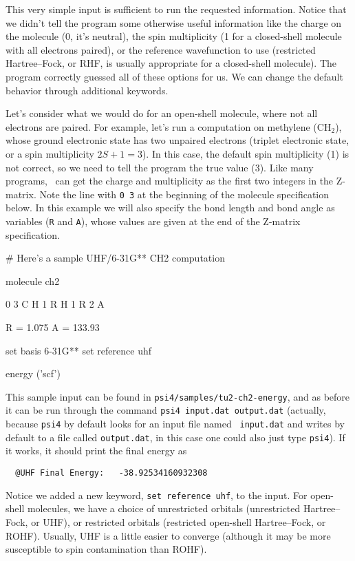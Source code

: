 This very simple input is sufficient to run the requested information.
Notice that we didn't tell the program some otherwise useful information
like the charge on the molecule (0, it's neutral), the spin multiplicity
(1 for a closed-shell molecule with all electrons paired), or the reference
wavefunction to use (restricted Hartree--Fock, or RHF, is usually
appropriate for a closed-shell molecule).  The program correctly guessed
all of these options for us.  We can change the default behavior through
additional keywords.  

Let's consider what we would do for an open-shell molecule, where
not all electrons are paired.  For example, let's run a computation
on methylene (CH$_2$), whose ground electronic state has two unpaired
electrons (triplet electronic state, or a spin multiplicity $2S+1 = 3$).
In this case, the default spin multiplicity (1) is not correct, so we
need to tell the program the true value (3).  Like many programs, \PSIfour\
can get the charge and multiplicity as the first two integers in the
Z-matrix.  Note the line with {\tt 0 3} at the beginning of the molecule
specification below.  In this example we will also specify the bond length
and bond angle as variables ({\tt R} and {\tt A}), whose values are given
at the end of the Z-matrix specification.

\begin{Snippet}
# Here's a sample UHF/6-31G** CH2 computation

molecule ch2 {
  0 3
  C
  H 1 R
  H 1 R 2 A

  R = 1.075
  A = 133.93
}

set basis 6-31G**
set reference uhf

energy ('scf')
\end{Snippet}

This sample input can be found in {\tt psi4/samples/tu2-ch2-energy}, and as
before it can be run through the command {\tt psi4 input.dat output.dat}
(actually, because {\tt psi4} by default looks for an input file named {\tt
input.dat} and writes by default to a file called {\tt output.dat}, in this
case one could also just type {\tt psi4}).  If it works, it should print
the final energy as
\begin{verbatim}
  @UHF Final Energy:   -38.92534160932308
\end{verbatim}
Notice we added a new keyword, {\tt set reference uhf}, to the input.  For
open-shell molecules, we have a choice of unrestricted orbitals
(unrestricted Hartree--Fock, or UHF), or restricted orbitals (restricted
open-shell Hartree--Fock, or ROHF).  Usually, UHF is a little easier to
converge (although it may be more susceptible to spin contamination than
ROHF).

